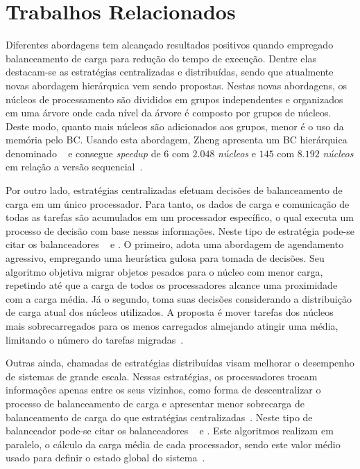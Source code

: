 \section{Trabalhos Relacionados}
Diferentes abordagens tem alcançado resultados positivos quando empregado balanceamento de carga para redução do tempo de execução.
Dentre elas destacam-se as estratégias centralizadas e distribuídas, sendo que atualmente novas abordagem hierárquica vem sendo propostas. 
Nestas novas abordagens, os núcleos de processamento são  divididos em grupos independentes e organizados em uma árvore onde  
cada nível da árvore é composto por grupos de núcleos. Deste modo, quanto mais núcleos  são adicionados aos grupos, menor é o uso da memória pelo BC.
Usando esta abordagem, Zheng apresenta um BC hierárquica denominado \hybridlb~ e consegue \textit{speedup} de $6$ com $2.048$ \textit{núcleos} e $145$ com $8.192$ \textit{núcleos} em relação a versão sequencial~\cite{zheng2010}. 

Por outro lado, estratégias centralizadas efetuam decisões de balanceamento de carga em um único processador. Para tanto, os dados de carga e comunicação de todas as tarefas são acumulados em um processador específico, o qual executa um processo de decisão com base nessas informações.
Neste tipo de estratégia pode-se citar os balanceadores \greedylb~ e .
O primeiro, adota uma abordagem de agendamento agressivo, empregando uma heurística gulosa para tomada de decisões.  Seu algoritmo objetiva migrar objetos pesados para o núcleo com menor carga, repetindo até que a carga de todos os processadores alcance uma proximidade com a carga média.
Já o segundo, toma suas decisões considerando a distribuição de carga atual dos núcleos utilizados. A proposta é mover tarefas dos núcleos mais sobrecarregados para os menos carregados almejando atingir uma média, limitando o número do tarefas migradas~\cite{zheng2011periodic}. 

Outras ainda, chamadas de estratégias distribuídas visam melhorar o desempenho de sistemas de grande escala. Nessas estratégias, os processadores trocam informações apenas entre os seus vizinhos, como forma de descentralizar o processo de balanceamento de carga e apresentar menor sobrecarga de balanceamento de carga do que estratégias centralizadas~\cite{Kale:1993:CPC:165854.165874}.
Neste tipo de balanceador pode-se citar os balanceadores \grapelb~ e \grapepluslb.
Este algoritmos realizam em paralelo, o cálculo da carga média de cada processador, sendo este valor médio usado para definir o estado global do sistema~\cite{menon2013distributed}.